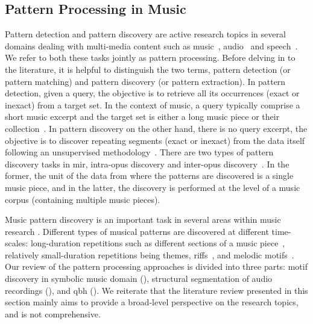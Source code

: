 \subsection{Pattern Processing in Music}
\label{sec:pattern_processin_in_music}

Pattern detection and pattern discovery are active research topics in several domains dealing with multi-media content such as music~\citep{klapuri2010pattern}, audio~\citep{Herley2006} and speech~\citep{Park2008}. We refer to both these tasks jointly as pattern processing. Before delving in to the literature, it is helpful to distinguish the two terms, pattern detection (or pattern matching) and pattern discovery (or pattern extraction). In pattern detection, given a query, the objective is to retrieve all its occurrences (exact or inexact) from a target set. In the context of music, a query typically comprise a short music excerpt and the target set is either a long music piece or their collection~\citep{ghias1995query}. In pattern discovery on the other hand, there is no query excerpt, the objective is to discover repeating segments (exact or inexact) from the data itself following an unsupervised methodology~\citep{dannenberg2003pattern}. There are two types of pattern discovery tasks in \gls{mir}, intra-opus discovery and inter-opus discovery~\citep{conklin2001representation}. In the former,\textsl{} the unit of the data from where the patterns are discovered is a single music piece, and in the latter, the discovery is performed at the level of a music corpus (containing multiple music pieces).

Music pattern discovery is an important task in several areas within music research \citep{collins2011modeling,conklin2011comparative,serra2014unsupervised,nieto2012compressing}. Different types of musical patterns are discovered at different time-scales: long-duration repetitions such as different sections of a music piece~\citep{serra2012unsupervised,Goto06TASLP}, relatively small-duration repetitions being themes, riffs~\citep{Hsu2001a}, and melodic motifs~\citep{collins2011improved}. Our review of the pattern processing approaches is divided into three parts: motif discovery in symbolic music domain (), structural segmentation of audio recordings (), and \gls{qbh} (). We reiterate that the literature review presented in this section mainly aims to provide a broad-level perspective on the research topics, and is not comprehensive.

